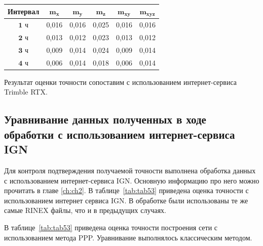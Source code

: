 \begin{table} [htbp]
	\centering\small
	\label{tab:tab52}
	\begin{threeparttable}%
		\setlength{\tabcolsep}{5pt}
		
		\begin{tabular}{ c
				S[table-number-alignment = center]
				S[table-number-alignment = center]
				S[table-number-alignment = center]
				S[table-number-alignment = center]
				S[table-number-alignment = center] }
			
			\toprule
			\textbf{Интервал}	& $\mathbf{m_x}$& $\mathbf{m_y}$& $\mathbf{m_z}$& $\mathbf{m_{xy}}$	& $\mathbf{m_{xyz}}$	\\ \midrule%
			$\mathbf{1}$ ч		&  0,016		&  0,016		&  0,025		&	0,016			&	0,016		\\ %
			$\mathbf{2}$ ч		&  0,013		&  0,012		&  0,023		&	0,013			&	0,012		\\ %
			$\mathbf{3}$ ч		&  0,009 		&  0,014		&  0,024		&	0,009			&	0,014		\\ %
			$\mathbf{4}$ ч		&  0,006		&  0,014		&  0,018		&	0,006			&	0,014		\\ \bottomrule
		\end{tabular}
		
	\end{threeparttable}
\end{table}
 
  
Результат оценки точности сопоставим с использованием интернет-сервиса Trimble RTX.
  
  
\subsection{Уравнивание данных полученных в ходе обработки с использованием интернет-сервиса IGN}\label{subsec:ch3/sec3/sub3}
 
Для контроля подтверждения получаемой точности выполнена обработка данных с использованием интернет-сервиса IGN. Основную информацию про него можно прочитать в главе \cref{ch:ch2}. В таблице~\cref{tab:tab53} приведена оценка точности с использованием интернет сервиса IGN. В обработке были использованы те же самые RINEX файлы, что и в предыдущих случаях.
 
В таблице~\cref{tab:tab53} приведена оценка точности построения сети с использованием метода PPP. Уравнивание выполнялось классическим методом.
  

